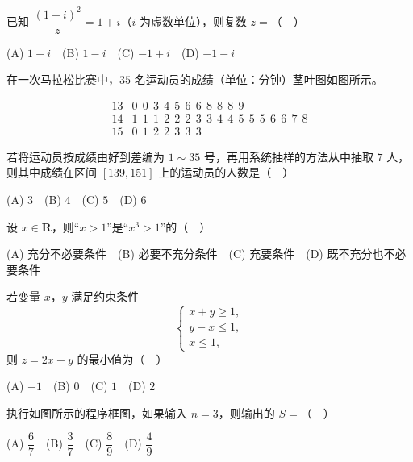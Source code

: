 

\begin{question}
已知 \(\dfrac{(1-i)^2}{z}=1+i\)（\(i\) 为虚数单位），则复数 \(z=\)（　）\par\smallskip

(A) \(1+i\)　(B) \(1-i\)　(C) \(-1+i\)　(D) \(-1-i\)

\end{question}
\begin{question}
在一次马拉松比赛中，\(35\) 名运动员的成绩（单位：分钟）茎叶图如图所示。

\nopagebreak[4]
\[
\begin{array}{c|l}
13 & 0\ \ 0\ \ 3\ \ 4\ \ 5\ \ 6\ \ 6\ \ 8\ \ 8\ \ 8\ \ 9 \\
14 & 1\ \ 1\ \ 1\ \ 2\ \ 2\ \ 2\ \ 3\ \ 3\ \ 4\ \ 4\ \ 5\ \ 5\ \ 5\ \ 6\ \ 6\ \ 7\ \ 8 \\
15 & 0\ \ 1\ \ 2\ \ 2\ \ 3\ \ 3\ \ 3
\end{array}
\]

若将运动员按成绩由好到差编为 \(1\sim35\) 号，再用系统抽样的方法从中抽取 \(7\) 人，则其中成绩在区间 \([139,151]\) 上的运动员的人数是（　）

(A) \(3\)　(B) \(4\)　(C) \(5\)　(D) \(6\)

\end{question}
\begin{question}
设 \(x\in\mathbf{R}\)，则“\(x>1\)”是“\(x^3>1\)”的（　）

(A) 充分不必要条件　(B) 必要不充分条件　(C) 充要条件　(D) 既不充分也不必要条件

\end{question}
\begin{question}
若变量 \(x\)，\(y\) 满足约束条件
\nopagebreak[4]
\[
\begin{cases}
x+y\geqslant1,\\
y-x\leqslant1,\\
x\leqslant1,
\end{cases}
\]
则 \(z=2x-y\) 的最小值为（　）

(A) \(-1\)　(B) \(0\)　(C) \(1\)　(D) \(2\)

\Needspace{0.4\textheight}
\end{question}
\begin{question}
执行如图所示的程序框图，如果输入 \(n=3\)，则输出的 \(S=\)（　）
\nopagebreak[4]
\begin{center}\end{center}
\nopagebreak[4]
(A) \(\dfrac67\)　(B) \(\dfrac37\)　(C) \(\dfrac89\)　(D) \(\dfrac49\)\par\smallskip

\end{question}
